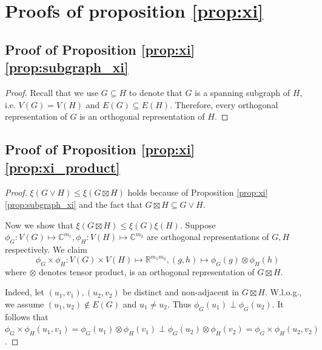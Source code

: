 \documentclass[journal, onecolumn, draftcls]{IEEEtran}
\theoremstyle{definition}
\newcommand{\bbC}{\mathbb{C}}
\newcommand{\bbR}{\mathbb{R}}
\begin{document}





 

 


 
 

 
 

 

 
\section{Proofs of proposition \ref{prop:xi}}\label{app:appendix_C}


\subsection{Proof of Proposition \ref{prop:xi} 
 \ref{prop:subgraph_xi}}
\begin{proof}
Recall that we use $G\subseteq H$ to denote that $G$ is a spanning subgraph of $H$, i.e. $V(G) = V(H)$ and $E(G)\subseteq E(H)$. Therefore, every orthogonal representation of $G$ is an orthogonal representation of $H$.
\end{proof}



\subsection{Proof of Proposition \ref{prop:xi}  \ref{prop:xi_product}}
\begin{proof}
$\xi(G\lor H)\le \xi(G\boxtimes H)$ holds because of 
Proposition \ref{prop:xi} \ref{prop:subgraph_xi} and the fact that $G\boxtimes H\subseteq G\lor H$. 

Now we show that $\xi(G\boxtimes H)\le \xi(G)\xi(H).$ Suppose $\phi_G:V(G)\mapsto \bbC^{m_1},\phi_H:V(H)\mapsto \bbC^{m_2}$ are   orthogonal representations of $G,H$ respectively. We claim $$
\phi_G\times\phi_H:V(G)\times V(H) \mapsto \bbR^{m_1m_2}, (g,h)\mapsto \phi_G(g) \otimes \phi_H(h)
$$
where $\otimes$ denotes tensor product, is an orthogonal representation of $G\boxtimes H$. 

Indeed, let $(u_1,v_1),(u_2,v_2)$ be distinct and non-adjacent in $G\boxtimes H$. W.l.o.g., we assume $(u_1,u_2)\notin E(G)$ and $u_1\ne u_2$. Thus $\phi_G(u_1)\perp\phi_G(u_2)$. It follows that $\phi_G\times\phi_H(u_1,v_1)=\phi_G(u_1)\otimes\phi_H(v_1) \perp \phi_G(u_2)\otimes\phi_H(v_2)= \phi_G\times\phi_H(u_2,v_2)$.
\end{proof}
\end{document}
